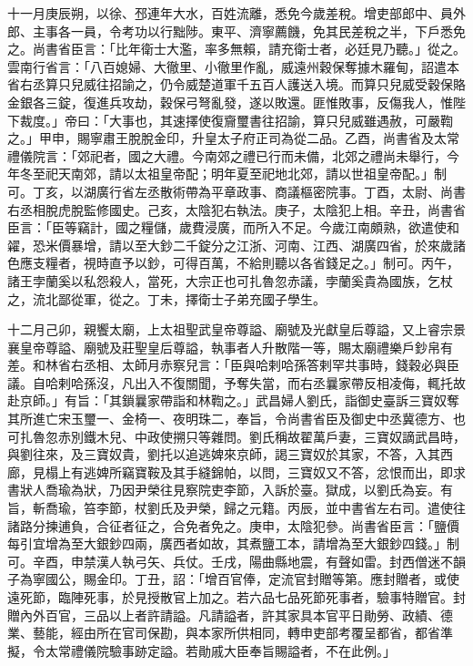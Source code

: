 \begin{pinyinscope}
 十一月庚辰朔，以徐、邳連年大水，百姓流離，悉免今歲差稅。增吏部郎中、員外郎、主事各一員，令考功以行黜陟。東平、濟寧薦饑，免其民差稅之半，下戶悉免之。尚書省臣言：「比年衛士大濫，率多無賴，請充衛士者，必廷見乃聽。」從之。雲南行省言：「八百媳婦、大徹里、小徹里作亂，威遠州穀保奪據木羅甸，詔遣本省右丞算只兒威往招諭之，仍令威楚道軍千五百人護送入境。而算只兒威受穀保賂金銀各三錠，復進兵攻劫，穀保弓弩亂發，遂以敗還。匪惟敗事，反傷我人，惟陛下裁度。」帝曰：「大事也，其速擇使復齎璽書往招諭，算只兒威雖遇赦，可嚴鞫之。」甲申，賜寧肅王脫脫金印，升皇太子府正司為從二品。乙酉，尚書省及太常禮儀院言：「郊祀者，國之大禮。今南郊之禮已行而未備，北郊之禮尚未舉行，今年冬至祀天南郊，請以太祖皇帝配；明年夏至祀地北郊，請以世祖皇帝配。」制可。丁亥，以湖廣行省左丞散術帶為平章政事、商議樞密院事。丁酉，太尉、尚書右丞相脫虎脫監修國史。己亥，太陰犯右執法。庚子，太陰犯上相。辛丑，尚書省臣言：「臣等竊計，國之糧儲，歲費浸廣，而所入不足。今歲江南頗熟，欲遣使和糴，恐米價暴增，請以至大鈔二千錠分之江浙、河南、江西、湖廣四省，於來歲諸色應支糧者，視時直予以鈔，可得百萬，不給則聽以各省錢足之。」制可。丙午，諸王孛蘭奚以私怨殺人，當死，大宗正也可扎魯忽赤議，孛蘭奚貴為國族，乞杖之，流北鄙從軍，從之。丁未，擇衛士子弟充國子學生。



 十二月己卯，親饗太廟，上太祖聖武皇帝尊謚、廟號及光獻皇后尊謚，又上睿宗景襄皇帝尊謚、廟號及莊聖皇后尊謚，執事者人升散階一等，賜太廟禮樂戶鈔帛有差。和林省右丞相、太師月赤察兒言：「臣與哈剌哈孫答剌罕共事時，錢穀必與臣議。自哈剌哈孫沒，凡出入不復關聞，予奪失當，而右丞曩家帶反相凌侮，輒托故赴京師。」有旨：「其鎖曩家帶詣和林鞫之。」武昌婦人劉氏，詣御史臺訴三寶奴奪其所進亡宋玉璽一、金椅一、夜明珠二，奉旨，令尚書省臣及御史中丞冀德方、也可扎魯忽赤別鐵木兒、中政使搠只等雜問。劉氏稱故翟萬戶妻，三寶奴謫武昌時，與劉往來，及三寶奴貴，劉托以追逃婢來京師，謁三寶奴於其家，不答，入其西廊，見榻上有逃婢所竊寶鞍及其手縫錦帕，以問，三寶奴又不答，忿恨而出，即求書狀人喬瑜為狀，乃因尹榮往見察院吏李節，入訴於臺。獄成，以劉氏為妄。有旨，斬喬瑜，笞李節，杖劉氏及尹榮，歸之元籍。丙辰，並中書省左右司。遣使往諸路分揀逋負，合征者征之，合免者免之。庚申，太陰犯參。尚書省臣言：「鹽價每引宜增為至大銀鈔四兩，廣西者如故，其煮鹽工本，請增為至大銀鈔四錢。」制可。辛酉，申禁漢人執弓矢、兵仗。壬戌，陽曲縣地震，有聲如雷。封西僧迷不韻子為寧國公，賜金印。丁丑，詔：「增百官俸，定流官封贈等第。應封贈者，或使遠死節，臨陣死事，於見授散官上加之。若六品七品死節死事者，驗事特贈官。封贈內外百官，三品以上者許請謚。凡請謚者，許其家具本官平日勛勞、政績、德業、藝能，經由所在官司保勘，與本家所供相同，轉申吏部考覆呈都省，都省準擬，令太常禮儀院驗事跡定謚。若勛戚大臣奉旨賜謚者，不在此例。」




\end{pinyinscope}
